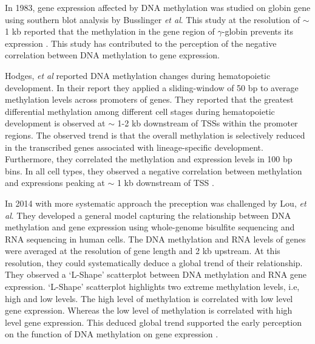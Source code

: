 \documentclass[review,12pt]{elsarticle}
\begin{document}
In 1983, gene expression affected by DNA methylation was studied on globin gene using southern blot analysis by Busslinger \textit{et al}.
This study at the resolution of $\sim$ 1 kb reported that the methylation in the gene region of $\gamma$-globin prevents its expression \cite{busslinger1983dna}. 
This study has contributed to the perception of the negative correlation between DNA methylation to gene expression.

Hodges, \textit{et al} reported DNA methylation changes during hematopoietic development.
In their report they applied a sliding-window of 50 bp to average methylation levels across promoters of genes. 
They reported that the greatest differential methylation among different cell stages during hematopoietic development is observed at $\sim$ 1-2 kb downstream of TSSs within the promoter regions.
The observed trend is that the overall methylation is selectively reduced in the transcribed genes associated with lineage-specific development.
Furthermore, they correlated the methylation and expression levels in 100 bp bins.
In all cell types, they observed a negative correlation between methylation and expressions peaking at $\sim$ 1 kb downstream of TSS \cite{hodges2011directional}.

In 2014 with more systematic approach the preception was challenged by Lou, \textit{et al}. 
They developed a general model capturing the relationship between DNA methylation and gene expression using whole-genome bisulfite sequencing and RNA sequencing in human cells.
The DNA methylation and RNA levels of genes were averaged at the resolution of gene length and 2 kb upstream.
At this resolution, they could systematically deduce a global trend of their relationship.
They observed a `L-Shape' scatterplot between DNA methylation and RNA gene expression.
`L-Shape' scatterplot highlights two extreme methylation levels, i.e, high and low levels.
The high level of methylation is correlated with low level gene expression.
Whereas the low level of methylation is correlated with high level gene expression.
This deduced global trend supported the early perception on the function of DNA methylation on gene expression \cite{lou2014whole}. 
\end{document}
